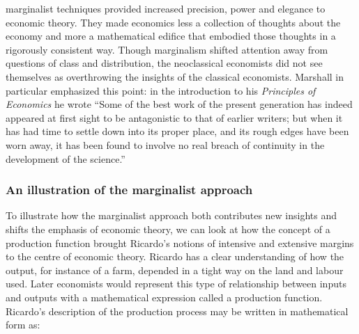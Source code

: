 
\Gls{marginalist} techniques provided increased precision, power and elegance to economic theory. They made economics less a collection of thoughts about the economy and more a mathematical edifice that embodied those thoughts in a rigorously consistent way. Though \gls{marginalism}  shifted attention away from questions of class and distribution, %
the neoclassical economists did not see themselves as overthrowing the insights of the classical economists. Marshall in particular emphasized this point: in the introduction to his \textit{Principles of Economics} he wrote ``Some of the best work of the present generation has indeed appeared at first sight to be antagonistic to that of earlier writers; but when it has had time to settle down into its proper place, and its rough edges have been worn away, it has been found to involve no real breach of continuity in the development of the science.'' 

\subsubsection{An illustration of the marginalist approach}
To illustrate how the marginalist approach both contributes new insights and shifts the emphasis of economic theory,  we can look at how the concept of a production function brought Ricardo's notions of intensive and extensive margins to the centre of economic theory. 
Ricardo has a clear understanding of how the output, for instance of a farm, depended in a tight way on the land and labour used. Later economists would represent this type of relationship between inputs and outputs with a mathematical expression called a production function.  %
Ricardo's description of the production process may be written in mathematical form as:

